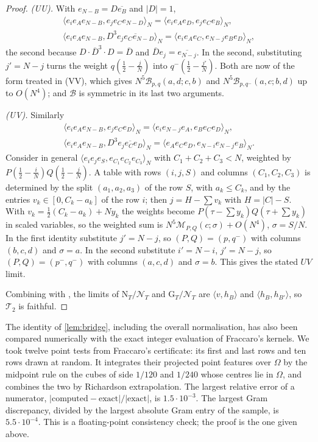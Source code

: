 \documentclass[11pt,colorlinks]{charlie}
\newcommand{\Om}{\Omega}
\newcommand{\ip}[2]{\langle #1,#2\rangle}
\begin{document}
\begin{proof}
\emph{(UU).} With $e_{N-B}=D\overline{e_B}$ and $|D|=1$,
\begin{gather*}
 \ip{e_ie_Ae_{N-B}}{e_je_Ce_{N-D}}_N=\ip{e_ie_Ae_D}{e_je_Ce_B}_N,\\
 \ip{e_ie_Ae_{N-B}}{D^3\overline{e_je_Ce_{N-D}}}_N=\ip{e_ie_Ae_C}{e_{N-j}e_Be_D}_N ,
\end{gather*}
the second because $D\cdot\overline D^{3}\cdot D=\overline D$ and $\overline De_j=\overline{e_{N-j}}$. In the second, substituting $j'=N-j$ turns the weight $q(\frac12-\frac jN)$ into $q^-(\frac12-\frac{j'}N)$. Both are now of the form treated in (VV), which gives $N^5\mathcal B_{p,q}(a,d;c,b)$ and $N^5\mathcal B_{p,q^-}(a,c;b,d)$ up to $O(N^4)$; and $\mathcal B$ is symmetric in its last two arguments.

\emph{(UV).} Similarly
\begin{gather*}
 \ip{e_ie_Ae_{N-B}}{e_je_Ce_D}_N=\ip{e_ie_{N-j}e_A}{e_Be_Ce_D}_N,\\
 \ip{e_ie_Ae_{N-B}}{D^3\overline{e_je_Ce_D}}_N=\ip{e_Ae_Ce_D}{e_{N-i}e_{N-j}e_B}_N .
\end{gather*}
Consider in general $\ip{e_{i}e_{j}e_{S}}{e_{C_1}e_{C_2}e_{C_3}}_N$ with $C_1+C_2+C_3<N$, weighted by $P(\frac12-\frac iN)Q(\frac12-\frac jN)$. A table with rows $(i,j,S)$ and columns $(C_1,C_2,C_3)$ is determined by the split $(a_1,a_2,a_3)$ of the row $S$, with $a_k\le C_k$, and by the entries $v_k\in[0,C_k-a_k]$ of the row $i$; then $j=H-\sum v_k$ with $H=|C|-S$. With $v_k=\frac12(C_k-a_k)+Ny_k$ the weights become $P(\tau-\sum y_k)Q(\tau+\sum y_k)$ in scaled variables, so the weighted sum is $N^5\mathcal M_{P,Q}(c;\sigma)+O(N^4)$, $\sigma=S/N$. In the first identity substitute $j'=N-j$, so $(P,Q)=(p,q^-)$ with columns $(b,c,d)$ and $\sigma=a$. In the second substitute $i'=N-i$, $j'=N-j$, so $(P,Q)=(p^-,q^-)$ with columns $(a,c,d)$ and $\sigma=b$. This gives the stated $UV$ limit.

Combining with , the limits of $\mathrm N_T/\mathcal N_T$ and $\mathrm G_T/\mathcal N_T$ are $\ip v{h_B}$ and $\ip{h_B}{h_{B'}}$, so $\mathcal T_2$ is faithful.
\end{proof}

\begin{remark}
The identity of \cref{lem:bridge}, including the overall normalisation, has also been compared numerically with the exact integer evaluation of Fraccaro's kernels. We took twelve point tests from Fraccaro's certificate: its first and last rows and ten rows drawn at random. It integrates their projected point features over $\Om$ by the midpoint rule on the cubes of side $1/120$ and $1/240$ whose centres lie in $\Om$, and combines the two by Richardson extrapolation. The largest relative error of a numerator, $|\text{computed}-\text{exact}|/|\text{exact}|$, is $1.5\cdot10^{-3}$. The largest Gram discrepancy, divided by the largest absolute Gram entry of the sample, is $5.5\cdot10^{-4}$. This is a floating-point consistency check; the proof is the one given above.
\end{remark}
\end{document}
